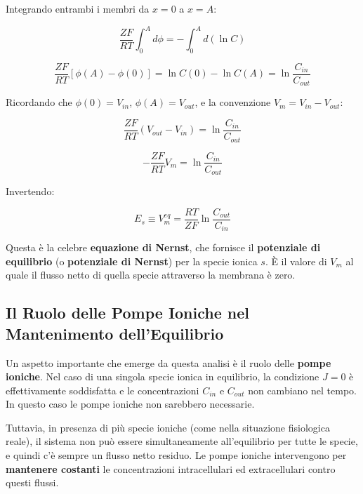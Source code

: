 Integrando entrambi i membri da $x = 0$ a $x = A$:

\begin{equation}
\frac{ZF}{RT} \int_0^A d\phi = -\int_0^A d(\ln C)
\end{equation}

\begin{equation}
\frac{ZF}{RT} \left[\phi(A) - \phi(0)\right] = \ln C(0) - \ln C(A) = \ln \frac{C_{in}}{C_{out}}
\end{equation}

Ricordando che $\phi(0) = V_{in}$, $\phi(A) = V_{out}$, e la convenzione $V_m = V_{in} - V_{out}$:

\begin{equation}
\frac{ZF}{RT}(V_{out} - V_{in}) = \ln \frac{C_{in}}{C_{out}}
\end{equation}

\begin{equation}
-\frac{ZF}{RT} V_m = \ln \frac{C_{in}}{C_{out}}
\end{equation}

Invertendo:

\begin{equation}
\boxed{E_s \equiv V_m^{eq} = \frac{RT}{ZF} \ln \frac{C_{out}}{C_{in}}}
\end{equation}

Questa è la celebre \textbf{equazione di Nernst}, che fornisce il \textbf{potenziale di equilibrio} (o \textbf{potenziale di Nernst}) per la specie ionica $s$. È il valore di $V_m$ al quale il flusso netto di quella specie attraverso la membrana è zero.

\subsection{Il Ruolo delle Pompe Ioniche nel Mantenimento dell'Equilibrio}

Un aspetto importante che emerge da questa analisi è il ruolo delle \textbf{pompe ioniche}. Nel caso di una singola specie ionica in equilibrio, la condizione $J = 0$ è effettivamente soddisfatta e le concentrazioni $C_{in}$ e $C_{out}$ non cambiano nel tempo. In questo caso le pompe ioniche non sarebbero necessarie.

Tuttavia, in presenza di più specie ioniche (come nella situazione fisiologica reale), il sistema non può essere simultaneamente all'equilibrio per tutte le specie, e quindi c'è sempre un flusso netto residuo. Le pompe ioniche intervengono per \textbf{mantenere costanti} le concentrazioni intracellulari ed extracellulari contro questi flussi.

